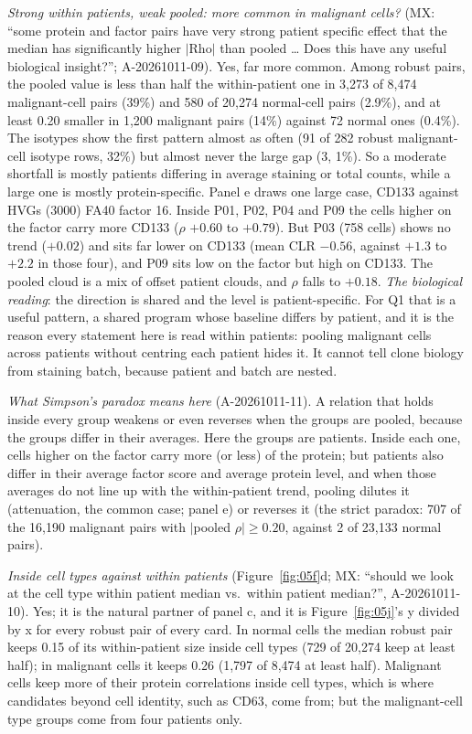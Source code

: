 \emph{Strong within patients, weak pooled: more common in malignant cells?} (MX: ``some protein and factor pairs have very strong patient specific effect that the median has significantly higher $|$Rho$|$ than pooled \ldots{} Does this have any useful biological insight?''; A-20261011-09). Yes, far more common. Among robust pairs, the pooled value is less than half the within-patient one in 3,273 of 8,474 malignant-cell pairs (39\%) and 580 of 20,274 normal-cell pairs (2.9\%), and at least 0.20 smaller in 1,200 malignant pairs (14\%) against 72 normal ones (0.4\%). The isotypes show the first pattern almost as often (91 of 282 robust malignant-cell isotype rows, 32\%) but almost never the large gap (3, 1\%). So a moderate shortfall is mostly patients differing in average staining or total counts, while a large one is mostly protein-specific. Panel e draws one large case, CD133 against HVGs (3000) FA40 factor 16. Inside P01, P02, P04 and P09 the cells higher on the factor carry more CD133 ($\rho$ $+0.60$ to $+0.79$). But P03 (758 cells) shows no trend ($+0.02$) and sits far lower on CD133 (mean CLR $-0.56$, against $+1.3$ to $+2.2$ in those four), and P09 sits low on the factor but high on CD133. The pooled cloud is a mix of offset patient clouds, and $\rho$ falls to $+0.18$. \emph{The biological reading}: the direction is shared and the level is patient-specific. For Q1 that is a useful pattern, a shared program whose baseline differs by patient, and it is the reason every statement here is read within patients: pooling malignant cells across patients without centring each patient hides it. It cannot tell clone biology from staining batch, because patient and batch are nested.

\emph{What Simpson's paradox means here} (A-20261011-11). A relation that holds inside every group weakens or even reverses when the groups are pooled, because the groups differ in their averages. Here the groups are patients. Inside each one, cells higher on the factor carry more (or less) of the protein; but patients also differ in their average factor score and average protein level, and when those averages do not line up with the within-patient trend, pooling dilutes it (attenuation, the common case; panel e) or reverses it (the strict paradox: 707 of the 16,190 malignant pairs with $|$pooled $\rho| \geq 0.20$, against 2 of 23,133 normal pairs).

\emph{Inside cell types against within patients} (Figure~\ref{fig:05f}d; MX: ``should we look at the cell type within patient median vs.\ within patient median?'', A-20261011-10). Yes; it is the natural partner of panel c, and it is Figure~\ref{fig:05j}'s y divided by x for every robust pair of every card. In normal cells the median robust pair keeps 0.15 of its within-patient size inside cell types (729 of 20,274 keep at least half); in malignant cells it keeps 0.26 (1,797 of 8,474 at least half). Malignant cells keep more of their protein correlations inside cell types, which is where candidates beyond cell identity, such as CD63, come from; but the malignant-cell type groups come from four patients only.

